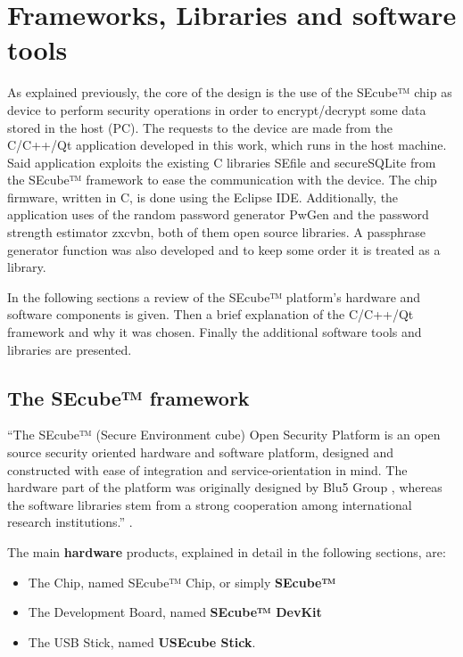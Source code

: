 \chapter{Frameworks, Libraries and software tools} \label{chap:lib}

As explained previously, the core of the design is the use of the SEcube™ chip as device to perform security operations in order to encrypt/decrypt some data stored in the host (PC). The requests to the device are made from the C/C++/Qt application developed in this work, which runs in the host machine. Said application exploits the existing C libraries SEfile and secureSQLite from the SEcube™ framework to ease the communication with the device. The chip firmware, written in C, is done using the Eclipse IDE. Additionally, the application uses of the random password generator PwGen and the password strength estimator zxcvbn, both of them open source libraries. A passphrase generator function was also developed and to keep some order it is treated as a library.

In the following sections a review of the SEcube™ platform's hardware and software components is given. Then a brief explanation of the C/C++/Qt framework and why it was chosen. Finally the additional software tools and libraries are presented.

\section{The SEcube™ framework}

``The SEcube™ (Secure Environment cube) Open Security Platform is an open source security oriented hardware and software platform, designed and constructed with ease of integration and service-orientation in mind. The hardware part of the platform was originally designed by Blu5 Group \cite{Blu5}, whereas the software libraries stem from a strong cooperation among international research institutions.'' \cite{GetStart}.

\vspace{5pt}

The main \textbf{hardware} products, explained in detail in the following sections, are:
\begin{itemize}
\setlength\itemsep{0pt}
\item The Chip, named SEcube™ Chip, or simply \textbf{SEcube™}
\item The Development Board, named \textbf{SEcube™ DevKit}
\item The USB Stick, named \textbf{USEcube Stick}.
\end{itemize}

